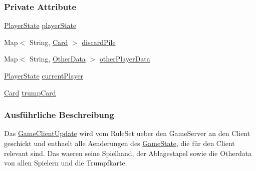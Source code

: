 \subsubsection*{Private Attribute}
\begin{DoxyCompactItemize}
\item 
\hypertarget{a00059_a714271f36dd46095e0a17c44fdd1cbab}{\hyperlink{a00065}{Player\-State} \hyperlink{a00059_a714271f36dd46095e0a17c44fdd1cbab}{player\-State}}\label{a00059_a714271f36dd46095e0a17c44fdd1cbab}

\item 
\hypertarget{a00059_abf51aa3b896825ac08fa574e68701e86}{Map$<$ String, \hyperlink{a00054}{Card} $>$ \hyperlink{a00059_abf51aa3b896825ac08fa574e68701e86}{discard\-Pile}}\label{a00059_abf51aa3b896825ac08fa574e68701e86}

\item 
\hypertarget{a00059_aecd7d72c15fb82c72297bfe838053122}{Map$<$ String, \hyperlink{a00064}{Other\-Data} $>$ \hyperlink{a00059_aecd7d72c15fb82c72297bfe838053122}{other\-Player\-Data}}\label{a00059_aecd7d72c15fb82c72297bfe838053122}

\item 
\hypertarget{a00059_aa84e85401d48f310ee9959621f6c4fba}{\hyperlink{a00065}{Player\-State} \hyperlink{a00059_aa84e85401d48f310ee9959621f6c4fba}{current\-Player}}\label{a00059_aa84e85401d48f310ee9959621f6c4fba}

\item 
\hypertarget{a00059_ab25322829797b0de34227a8e2cdb1929}{\hyperlink{a00054}{Card} \hyperlink{a00059_ab25322829797b0de34227a8e2cdb1929}{trump\-Card}}\label{a00059_ab25322829797b0de34227a8e2cdb1929}

\end{DoxyCompactItemize}


\subsubsection{Ausführliche Beschreibung}
Das \hyperlink{a00059}{Game\-Client\-Update} wird vom Rule\-Set ueber den Game\-Server an den Client geschickt und enthaelt alle Aenderungen des \hyperlink{a00061}{Game\-State}, die für den Client relevant sind. Das waeren seine Spielhand, der Ablagestapel sowie die Otherdata von allen Spielern und die Trumpfkarte. 

